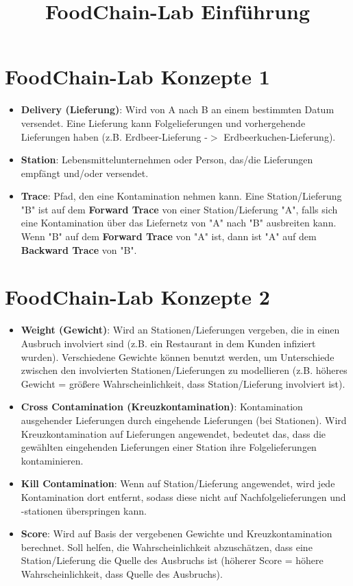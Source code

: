\documentclass{beamer}
\title{FoodChain-Lab Einführung}
\date{}
\begin{document}
\maketitle

\section{FoodChain-Lab Konzepte 1}
\begin{frame}
	\begin{itemize}
		\item \textbf{Delivery (Lieferung)}: Wird von A nach B an einem bestimmten Datum versendet. Eine Lieferung kann Folgelieferungen und vorhergehende Lieferungen haben (z.B. Erdbeer-Lieferung -$>$ Erdbeerkuchen-Lieferung).
		\item \textbf{Station}: Lebensmittelunternehmen oder Person, das/die Lieferungen empfängt und/oder versendet.
		\item \textbf{Trace}: Pfad, den eine Kontamination nehmen kann. Eine Station/Lieferung "B" ist auf dem \textbf{Forward Trace} von einer Station/Lieferung "A", falls sich eine Kontamination über das Liefernetz von "A" nach "B" ausbreiten kann. Wenn "B" auf dem \textbf{Forward Trace} von "A" ist, dann ist "A" auf dem \textbf{Backward Trace} von "B".
	\end{itemize}
\end{frame}

\section{FoodChain-Lab Konzepte 2}
\begin{frame}
	\small
	\begin{itemize}
		\item \textbf{Weight (Gewicht)}: Wird an Stationen/Lieferungen vergeben, die in einen Ausbruch involviert sind (z.B. ein Restaurant in dem Kunden infiziert wurden). Verschiedene Gewichte können benutzt werden, um Unterschiede zwischen den involvierten Stationen/Lieferungen zu modellieren (z.B. höheres Gewicht = größere Wahrscheinlichkeit, dass Station/Lieferung involviert ist).
		\item \textbf{Cross Contamination (Kreuzkontamination)}: Kontamination ausgehender Lieferungen durch eingehende Lieferungen (bei Stationen). Wird Kreuzkontamination auf Lieferungen angewendet, bedeutet das, dass die gewählten eingehenden Lieferungen einer Station ihre Folgelieferungen kontaminieren.
		\item \textbf{Kill Contamination}: Wenn auf Station/Lieferung angewendet, wird jede Kontamination dort entfernt, sodass diese nicht auf Nachfolgelieferungen und -stationen überspringen kann.
		\item \textbf{Score}: Wird auf Basis der vergebenen Gewichte und Kreuzkontamination berechnet. Soll helfen, die Wahrscheinlichkeit abzuschätzen, dass eine Station/Lieferung die Quelle des Ausbruchs ist (höherer Score = höhere Wahrscheinlichkeit, dass Quelle des Ausbruchs).
	\end{itemize}
\end{frame}
\end{document}

